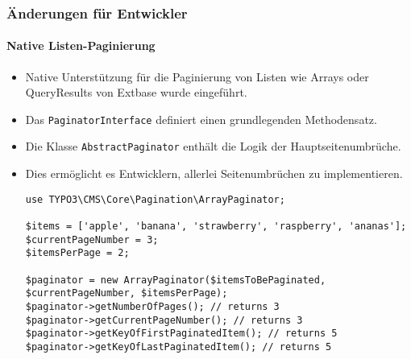 
\begin{frame}[fragile]
	\frametitle{Änderungen für Entwickler}
	\framesubtitle{Native Listen-Paginierung}

	\lstset{basicstyle=\tiny\ttfamily}

	\begin{itemize}
		\item Native Unterstützung für die Paginierung von Listen wie Arrays oder QueryResults von Extbase wurde eingeführt.
		\item Das \texttt{PaginatorInterface} definiert einen grundlegenden Methodensatz.
		\item Die Klasse \texttt{AbstractPaginator} enthält die Logik der Hauptseitenumbrüche.
		\item Dies ermöglicht es Entwicklern, allerlei Seitenumbrüchen zu implementieren.
\begin{lstlisting}
use TYPO3\CMS\Core\Pagination\ArrayPaginator;

$items = ['apple', 'banana', 'strawberry', 'raspberry', 'ananas'];
$currentPageNumber = 3;
$itemsPerPage = 2;

$paginator = new ArrayPaginator($itemsToBePaginated, $currentPageNumber, $itemsPerPage);
$paginator->getNumberOfPages(); // returns 3
$paginator->getCurrentPageNumber(); // returns 3
$paginator->getKeyOfFirstPaginatedItem(); // returns 5
$paginator->getKeyOfLastPaginatedItem(); // returns 5
\end{lstlisting}

	\end{itemize}

\end{frame}


